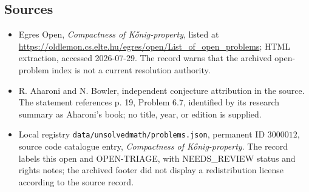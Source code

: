 \documentclass[11pt]{article}
\begin{document}
\subsection{Sources}
\begin{itemize}
\item Egres Open, \emph{Compactness of K\H{o}nig-property}, listed at \url{https://oldlemon.cs.elte.hu/egres/open/List_of_open_problems}; HTML extraction, accessed 2026-07-29. The record warns that the archived open-problem index is not a current resolution authority.
\item R. Aharoni and N. Bowler, independent conjecture attribution in the source. The statement references p. 19, Problem 6.7, identified by its research summary as Aharoni's book; no title, year, or edition is supplied.
\item Local registry \texttt{data/unsolvedmath/problems.json}, permanent ID $3000012$, source code catalogue entry, \emph{Compactness of K\H{o}nig-property}. The record labels this open and OPEN-TRIAGE, with NEEDS\_REVIEW status and rights notes; the archived footer did not display a redistribution license according to the source record.
\end{itemize}
\end{document}
